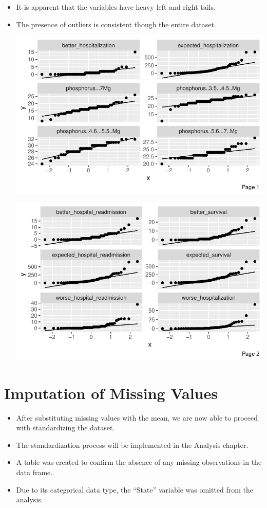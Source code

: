 \documentclass[
  letterpaper,
  DIV=11,
  numbers=noendperiod]{scrreprt}
\begin{document}
\begin{itemize}
\item
  It is apparent that the variables have heavy left and right tails.
\item
  The presence of outliers is consistent though the entire dataset.

  \includegraphics{dataset_files/figure-pdf/unnamed-chunk-8-1.pdf}

  \includegraphics{dataset_files/figure-pdf/unnamed-chunk-8-2.pdf}
\end{itemize}

\hypertarget{imputation-of-missing-values}{%
\section{Imputation of Missing
Values}\label{imputation-of-missing-values}}

\begin{itemize}
\item
  After substituting missing values with the mean, we are now able to
  proceed with standardizing the dataset.
\item
  The standardization process will be implemented in the Analysis
  chapter.
\item
  A table was created to confirm the absence of any missing observations
  in the data frame.
\item
  Due to its categorical data type, the ``State'' variable was omitted
  from the analysis.
\end{itemize}
\end{document}
